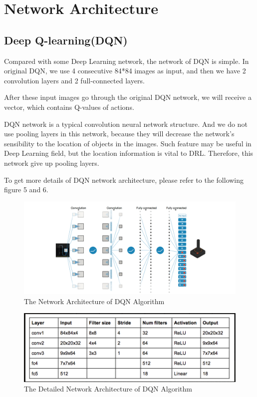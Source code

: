 \documentclass[10pt,twocolumn,letterpaper]{article}
\begin{document}
\section{Network Architecture}
  \subsection{Deep Q-learning(DQN)}
   Compared with some Deep Learning network, the network of DQN is simple. In original DQN, we use 4 consecutive 84*84 images as input, and then we have 2 convolution layers and 2 full-connected layers.
   
   After these input images go through the original DQN network, we will receive a vector, which contains Q-values of actions.
   
   DQN network is a typical convolution neural network structure. And we do not use pooling layers in this network, because they will decrease the network's sensibility to the location of objects in the images. Such feature may be useful in Deep Learning field, but the location information is vital to DRL. Therefore, this network give up pooling layers.
   
   To get more details of DQN network architecture, please refer to the following figure 5 and 6.
   
   \begin{figure}[!htb]
    	\centering
    	\includegraphics[width = \linewidth]{images/DQN1}
    	\caption{The Network Architecture of DQN Algorithm}
    	\label{fig::DQN1}
   \end{figure}
   
	\begin{figure}[!htb]
    	\centering
    	\includegraphics[width = \linewidth]{images/DQN2}
    	\caption{The Detailed Network Architecture of DQN Algorithm}
    	\label{fig::DQN2}
   \end{figure}
  
\end{document}
